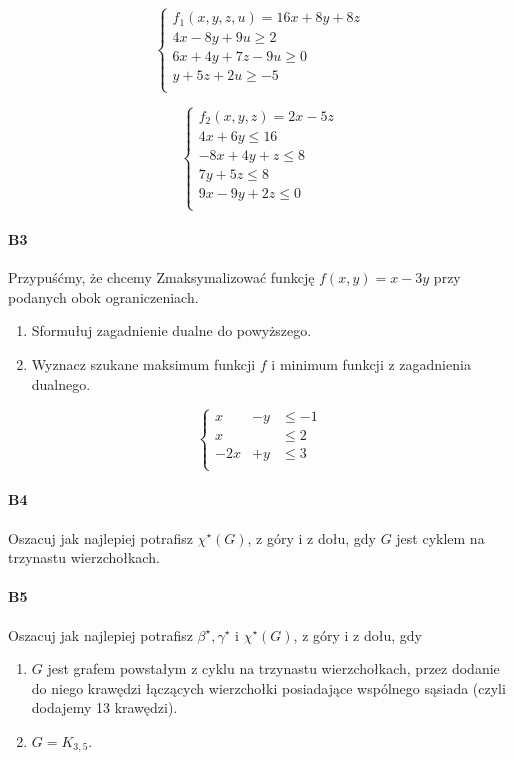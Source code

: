 \begin{minipage}{.5\textwidth}
$$\left\{\begin{matrix}
f_1(x, y, z, u) = 16x + 8y + 8z\\
4x - 8y + 9u \geq 2\\
6x + 4y + 7z - 9u \geq 0\\
y + 5z + 2u \geq -5\\
\end{matrix}\right.$$
\end{minipage}%
\begin{minipage}{.5\textwidth}
$$\left\{\begin{matrix}
f_2(x, y, z) = 2x - 5z\\
4x + 6y \leq 16\\
-8x + 4y + z \leq 8\\
7y + 5z \leq 8\\
9x - 9y + 2z \leq 0\\
\end{matrix}\right.$$
\end{minipage}



\paragraph{B3} Przypuśćmy, że chcemy Zmaksymalizować funkcję
$f(x, y) = x - 3y$ przy podanych obok ograniczeniach.
\begin{enumerate}[label=\alph*)]
\item Sformułuj zagadnienie dualne do powyższego.
\item Wyznacz szukane maksimum funkcji $f$ i minimum funkcji z zagadnienia dualnego.
\end{enumerate}
$$\left\{\begin{matrix}
x &- y &\leq -1\\
x &&\leq 2\\
-2x&+ y &\leq 3\\
\end{matrix}\right.$$

\paragraph{B4} Oszacuj jak najlepiej potrafisz $\chi ^\star(G)$, z góry i z dołu, gdy $G$ jest cyklem na trzynastu wierzchołkach.

\paragraph{B5} Oszacuj jak najlepiej potrafisz $\beta ^\star, \gamma ^\star \text{ i } \chi ^\star(G)$, z góry i z dołu, gdy
\begin{enumerate}[label=\alph*)]
\item  $G$ jest grafem powstałym z cyklu na trzynastu wierzchołkach, przez dodanie do niego krawędzi łączących wierzchołki posiadające wspólnego sąsiada (czyli dodajemy 13 krawędzi).
\item  $G = K_{3,5}$.
\end{enumerate}


